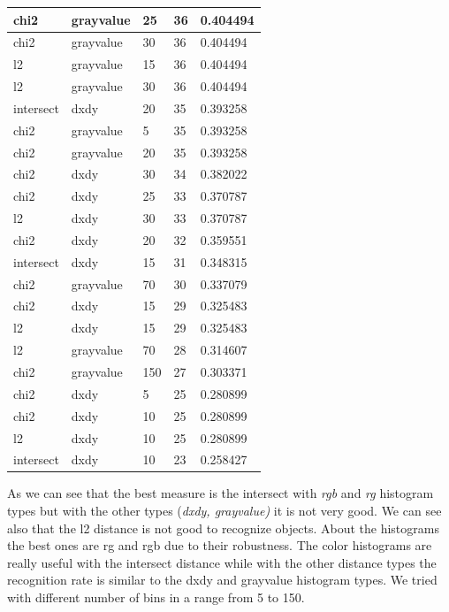\documentclass{article}
\begin{document}
\begin{longtable}{|l|l|l|l|l|}
    chi2          & grayvalue      & 25       & 36      & 0.404494 \\ \hline
    chi2          & grayvalue      & 30       & 36      & 0.404494 \\ \hline
    l2            & grayvalue      & 15       & 36      & 0.404494 \\ \hline
    l2            & grayvalue      & 30       & 36      & 0.404494 \\ \hline
    intersect     & dxdy           & 20       & 35      & 0.393258 \\ \hline
    chi2          & grayvalue      & 5        & 35      & 0.393258 \\ \hline
    chi2          & grayvalue      & 20       & 35      & 0.393258 \\ \hline
    chi2          & dxdy           & 30       & 34      & 0.382022 \\ \hline
    chi2          & dxdy           & 25       & 33      & 0.370787 \\ \hline
    l2            & dxdy           & 30       & 33      & 0.370787 \\ \hline
    chi2          & dxdy           & 20       & 32      & 0.359551 \\ \hline
    intersect     & dxdy           & 15       & 31      & 0.348315 \\ \hline
    chi2          & grayvalue      & 70       & 30      & 0.337079 \\ \hline
    chi2          & dxdy           & 15       & 29      & 0.325483 \\ \hline
    l2            & dxdy           & 15       & 29      & 0.325483 \\ \hline
    l2            & grayvalue      & 70       & 28      & 0.314607 \\ \hline
    chi2          & grayvalue      & 150      & 27      & 0.303371 \\ \hline
    chi2          & dxdy           & 5        & 25      & 0.280899 \\ \hline
    chi2          & dxdy           & 10       & 25      & 0.280899 \\ \hline
    l2            & dxdy           & 10       & 25      & 0.280899 \\ \hline
    intersect     & dxdy           & 10       & 23      & 0.258427 \\ \hline 
\end{longtable}

\noindent
As we can see that the best measure is the intersect with \textit{rgb} and \textit{rg} histogram types but with the other types (\textit{dxdy, grayvalue)} it is not very good.
We can see also that the l2 distance is not good to recognize objects.
\newline
\newline
About the histograms the best ones are rg and rgb due to their robustness. The color histograms are really useful with the intersect distance while with the other distance types the recognition rate is similar to the dxdy and grayvalue histogram types.
We tried with different number of bins in a range from 5 to 150.
\end{document}
